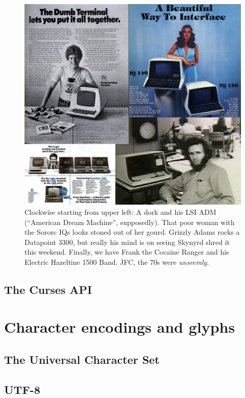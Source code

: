 \documentclass[letterpaper,10pt]{article}
\begin{document}
\begin{figure}
\begin{center}
\includegraphics[width=.9\linewidth]{media/dumbterminals.jpg}
\end{center}
\caption{Clockwise starting from upper left: A dork and his LSI ADM (``American
  Dream Machine'', supposedly). That poor woman with the Sororc IQs looks stoned out
  of her gourd. Grizzly Adams rocks a Datapoint 3300, but really his mind is on
  seeing Skynyrd shred it this weekend. Finally, we have Frank the Cocaine
  Ranger and his Electric Hazeltine 1500 Band. JFC, the 70s were \textit{unseemly}.}
\end{figure}


\subsection{The Curses API}

\section{Character encodings and glyphs}
\label{section:unicode}
\subsection{The Universal Character Set}
\subsection{UTF-8}
\end{document}
